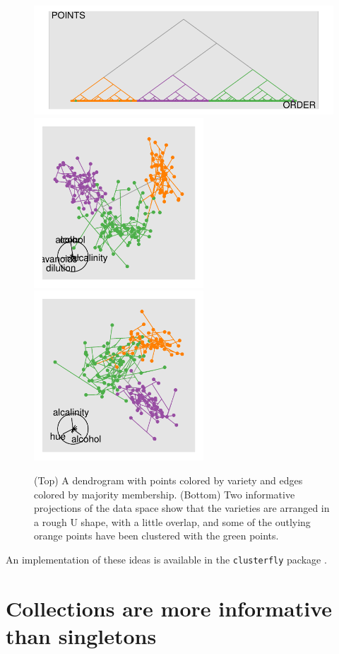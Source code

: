 \documentclass[preprint]{imsart}
\begin{document}
\begin{figure}[htbp]
  \centering
    \includegraphics[width=5.2in]{wine-hcward-1}
    \includegraphics[width=2.5in]{wine-hcward-2}%
    \includegraphics[width=2.5in]{wine-hcward-3}
  \caption{(Top) A dendrogram with points colored by variety and edges colored by majority membership. (Bottom) Two informative projections of the data space show that the varieties are arranged in a rough {\sf U} shape, with a little overlap, and some of the outlying orange points have been clustered with the green points.}
  \label{fig:wine-ggobi}
\end{figure}

An implementation of these ideas is available in the {\tt clusterfly} package \citep{clusterfly}.

\section{Collections are more informative than singletons}
\label{sec:collections}
\end{document}
